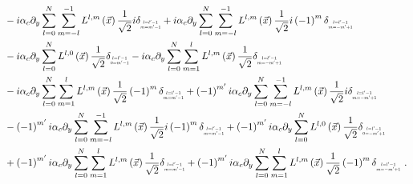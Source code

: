 \documentclass{egpubl}
\newcommand{\ud}{\,\mathrm{d}} %
\begin{document}
\begin{align*}
&-i\alpha_c\partial_y
\sum_{l=0}^{N}
\sum_{m=-l}^{-1}L^{l,m}\left (\vec{x}\right)
\frac{1}{\sqrt{2}}
i\delta_{\scaleto{\substack{l=l'-1\\m=m'-1}}{9pt}}
+i\alpha_c\partial_y
\sum_{l=0}^{N}
\sum_{m=-l}^{-1}L^{l,m}\left (\vec{x}\right)
\frac{1}{\sqrt{2}}
i
\left({-1}\right)^{m}
\delta_{\scaleto{\substack{l=l'-1\\m=-m'+1}}{9pt}}
\\&
-i\alpha_c\partial_y
\sum_{l=0}^{N}
L^{l,0}\left (\vec{x}\right)
\frac{1}{\sqrt{2}}
\delta_{\scaleto{\substack{l=l'-1\\0=m'-1}}{9pt}}
-i\alpha_c\partial_y
\sum_{l=0}^{N}
\sum_{m=1}^{l}L^{l,m}\left (\vec{x}\right)
\frac{1}{\sqrt{2}}
\delta_{\scaleto{\substack{l=l'-1\\m=-m'+1}}{9pt}}
\\&
-i\alpha_c\partial_y
\sum_{l=0}^{N}
\sum_{m=1}^{l}L^{l,m}\left (\vec{x}\right)
\frac{1}{\sqrt{2}}
\left({-1}\right)^{m}
\delta_{\scaleto{\substack{l=l'-1\\m=m'-1}}{9pt}}
+\left({-1}\right)^{m'}i\alpha_c\partial_y
\sum_{l=0}^{N}
\sum_{m=-l}^{-1}L^{l,m}\left (\vec{x}\right)
\frac{1}{\sqrt{2}}
i
\delta_{\scaleto{\substack{l=l'-1\\m=-m'+1}}{9pt}}
\\&
-\left({-1}\right)^{m'}i\alpha_c\partial_y
\sum_{l=0}^{N}
\sum_{m=-l}^{-1}L^{l,m}\left (\vec{x}\right)
\frac{1}{\sqrt{2}}
i
\left({-1}\right)^{m}
\delta_{\scaleto{\substack{l=l'-1\\m=m'-1}}{9pt}}
+
\left({-1}\right)^{m'}i\alpha_c\partial_y
\sum_{l=0}^{N}
L^{l,0}\left (\vec{x}\right)
\frac{1}{\sqrt{2}}
\delta_{\scaleto{\substack{l=l'-1\\0=-m'+1}}{9pt}}
\\&
+
\left({-1}\right)^{m'}i\alpha_c\partial_y
\sum_{l=0}^{N}
\sum_{m=1}^{l}L^{l,m}\left (\vec{x}\right)
\frac{1}{\sqrt{2}}
\delta_{\scaleto{\substack{l=l'-1\\m=m'-1}}{9pt}}
+
\left({-1}\right)^{m'}i\alpha_c\partial_y
\sum_{l=0}^{N}
\sum_{m=1}^{l}L^{l,m}\left (\vec{x}\right)
\frac{1}{\sqrt{2}}
\left({-1}\right)^{m}
\delta_{\scaleto{\substack{l=l'-1\\m=-m'+1}}{9pt}} \ .
\end{align*}
\end{document}
